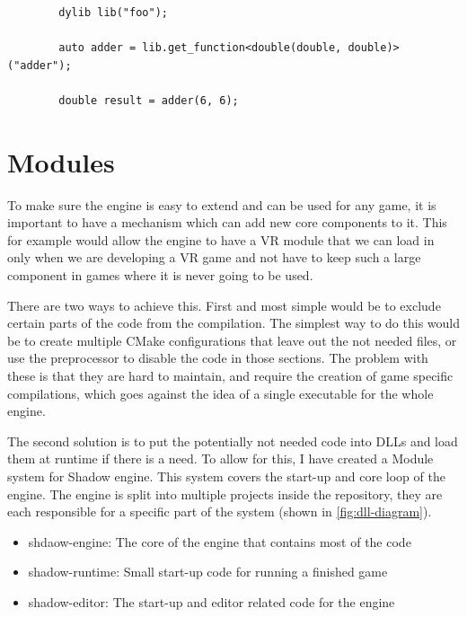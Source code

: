 \begin{listing}[h]
    \begin{verbatim}
        dylib lib("foo");
        
        auto adder = lib.get_function<double(double, double)>("adder");
        
        double result = adder(6, 6);
    \end{verbatim}
    \caption{Example of using the dylib library to load in a function from a DLL}
    \label{fig:dylib-example}
\end{listing}


\section{Modules}
To make sure the engine is easy to extend and can be used for any game, it is important to have a mechanism which can add new core components to it. This for example would allow the engine to have a VR module that we can load in only when we are developing a VR game and not have to keep such a large component in games where it is never going to be used.

There are two ways to achieve this. First and most simple would be to exclude certain parts of the code from the compilation. The simplest way to do this would be to create multiple CMake configurations that leave out the not needed files, or use the preprocessor to disable the code in those sections. The problem with these is that they are hard to maintain, and require the creation of game specific compilations, which goes against the idea of a single executable for the whole engine.

The second solution is to put the potentially not needed code into DLLs and load them at runtime if there is a need. To allow for this, I have created a Module system for Shadow engine. This system covers the start-up and core loop of the engine. The engine is split into multiple projects inside the repository, they are each responsible for a specific part of the system (shown in \ref{fig:dll-diagram}).

\begin{itemize}
    \item shdaow-engine: The core of the engine that contains most of the code
    \item shadow-runtime: Small start-up code for running a finished game
    \item shadow-editor: The start-up and editor related code for the engine
\end{itemize}

